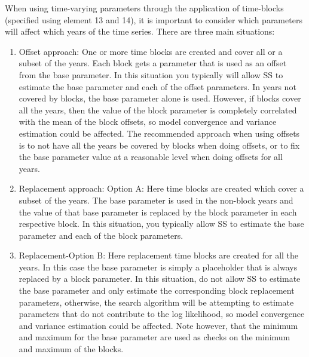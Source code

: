 When using time-varying parameters through the application of time-blocks (specified using element 13 and 14), it is important to consider which parameters will affect which years of the time series. There are three main situations:
\begin{enumerate}
	\item Offset approach: One or more time blocks are created and cover all or a subset of the years.  Each block gets a parameter that is used as an offset from the base parameter.  In this situation you typically will allow SS to estimate the base parameter and each of the offset parameters.  In years not covered by blocks, the base parameter alone is used.  However, if blocks cover all the years, then the value of the block parameter is completely correlated with the mean of the block offsets, so model convergence and variance estimation could be affected.  The recommended approach when using offsets is to not have all the years be covered by blocks when doing offsets, or to fix the base parameter value at a reasonable level when doing offsets for all years.	
	\item Replacement approach: Option A: Here time blocks are created which cover a subset of the years.  The base parameter is used in the non-block years and the value of that base parameter is replaced by the block parameter in each respective block.  In this situation, you typically allow SS to estimate the base parameter and each of the block parameters.	
	\item Replacement-Option B: Here replacement time blocks are created for all the years.  In this case the base parameter is simply a placeholder that is always replaced by a block parameter. In this situation, do not allow SS to estimate the base parameter and only estimate the corresponding block replacement parameters, otherwise, the search algorithm will be attempting to estimate parameters that do not contribute to the log likelihood, so model convergence and variance estimation could be affected.  Note however, that the minimum and maximum for the base parameter are used as checks on the minimum and maximum of the blocks.
\end{enumerate}

